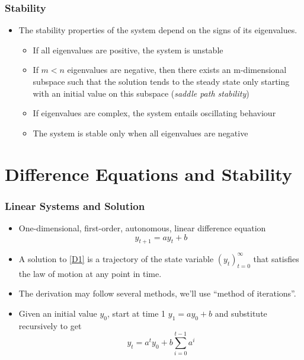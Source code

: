 \documentclass[11pt]{beamer}
\begin{document}

\begin{frame}
\frametitle{Stability}
\begin{itemize}\itemsep2ex
	\item The stability properties of the system depend on the signs of its eigenvalues.
	\begin{itemize}\itemsep2.5ex
		\item If all eigenvalues are positive, the system is unstable
		\item If $m<n$ eigenvalues are negative, then there exists an m-dimensional subspace such that the solution tends to the steady state only starting with an initial value on this subspace (\textit{saddle path stability})
		\item If eigenvalues are complex, the system entails oscillating behaviour
		\item The system is stable only when all eigenvalues are negative
	\end{itemize}
\end{itemize}
\end{frame}


\section{Difference Equations and Stability}




\begin{frame}
\frametitle{Linear Systems and Solution}
\begin{itemize}\itemsep2ex
	\item One-dimensional, first-order, autonomous, linear difference equation
	\begin{equation}
	\label{D1}
	y_{t+1} = a y_t + b
	\end{equation}
	\item A solution to \eqref{D1} is a trajectory of the state variable $(y_t)_{t=0}^{\infty}$ that satisfies the law of motion at any point in time.
	\item The derivation may follow several methods, we'll use ``method of iterations''.
	\item Given an initial value $y_0$, start at time 1 $y_1 = a y_0 + b$ and substitute recursively to get
	\begin{equation*}
	y_{t} = a^t y_0 + b \sum_{i=0}^{t-1} a^i
	\end{equation*}
\end{itemize}
\end{frame}
\end{document}
